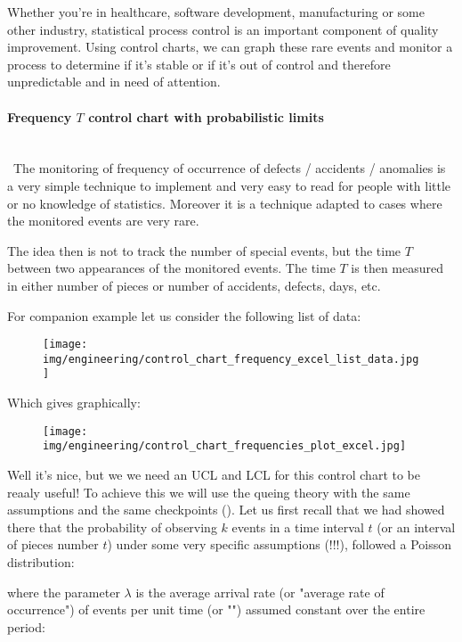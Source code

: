 	Whether you're in healthcare, software development, manufacturing or some other industry, statistical process control is an important component of quality improvement. Using control charts, we can graph these rare events and monitor a process to determine if it's stable or if it's out of control and therefore unpredictable and in need of attention.
	
	\paragraph{Frequency $T$ control chart with probabilistic limits}\mbox{}\\\
	The monitoring of frequency of occurrence of defects / accidents / anomalies is a very simple technique to implement and very easy to read for people with little or no knowledge of statistics. Moreover it is a technique adapted to cases where the monitored events are very rare.

	The idea then is not to track the number of special events, but the time $T$ between two appearances of the monitored events. The time $T$ is then measured in either number of pieces or number of accidents, defects, days, etc.

	For companion example let us consider the following list of data:
	\begin{figure}[H]
		\centering
		\texttt{[image: img/engineering/control\_chart\_frequency\_excel\_list\_data.jpg]}
	\end{figure}
	Which gives graphically:
	\begin{figure}[H]
		\centering
		\texttt{[image: img/engineering/control\_chart\_frequencies\_plot\_excel.jpg]}
	\end{figure}
	Well it's nice, but we we need an UCL and LCL for this control chart to be reaaly useful! To achieve this we will use the queing theory with the same assumptions and the same checkpoints (). Let us first recall that we had showed there  that the probability of observing $k$ events in a time interval $t$ (or an interval of pieces number $t$) under some very specific assumptions (!!!), followed a Poisson distribution:
	
	where the parameter $\lambda$ is the average arrival rate (or "average rate of occurrence") of events per unit time (or "") assumed constant over the entire period:
	
